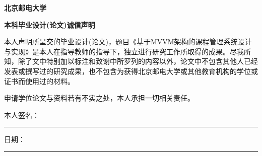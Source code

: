 \begin{center}
\textbf{\songti{}北京邮电大学}
\end{center}

\begin{center}
\textbf{\songti{} 本科毕业设计(论文)诚信声明}
\end{center}
\songti{}

本人声明所呈交的毕业设计(论文)，题目《基于MVVM架构的课程管理系统设计与实现》是本人在指导教师的指导下，独立进行研究工作所取得的成果。尽我所知，除了文中特别加以标注和致谢中所罗列的内容以外，论文中不包含其他人已经发表或撰写过的研究成果，也不包含为获得北京邮电大学或其他教育机构的学位或证书而使用过的材料。

申请学位论文与资料若有不实之处，本人承担一切相关责任。 \newline

\indent 本人签名：\rule[-2pt]{4cm}{0.5pt}\quad 日期：\rule[-2pt]{4cm}{0.5pt}


